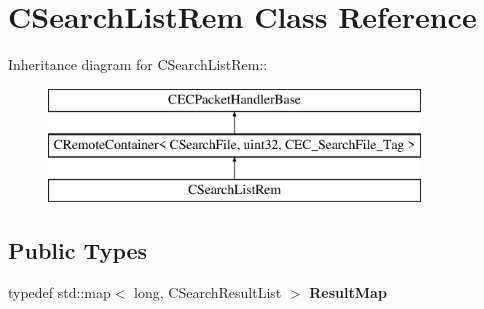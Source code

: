 \section{CSearchListRem Class Reference}
\label{classCSearchListRem}
Inheritance diagram for CSearchListRem::\begin{figure}[H]
\begin{center}
\leavevmode
\includegraphics[height=3cm]{classCSearchListRem}
\end{center}
\end{figure}
\subsection*{Public Types}
\begin{DoxyCompactItemize}
\item 
typedef std::map$<$ long, CSearchResultList $>$ {\bfseries ResultMap}\label{classCSearchListRem_a4770f25992f9ddf320778eb4e8fce478}

\end{DoxyCompactItemize}
